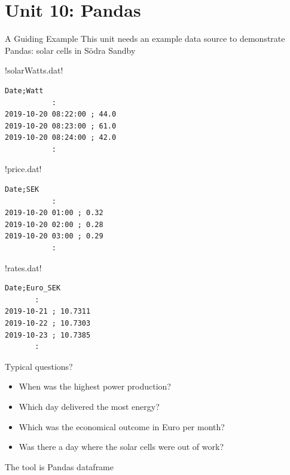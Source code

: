 \documentclass[hyperref={pdfpagelabels=false},table]{beamer}
\date{}
\begin{document}
\part{Unit 10: Pandas}


\begin{frame}[fragile]{A Guiding Example}
This unit needs an example data source to demonstrate
Pandas:  solar cells in Södra Sandby\\[0.5cm]
\begin{minipage}[h]{0.4\textwidth}
\lstset{basicstyle=\tiny}
\pyth!solarWatts.dat!
\begin{lstlisting}
Date;Watt
           :
2019-10-20 08:22:00 ; 44.0
2019-10-20 08:23:00 ; 61.0
2019-10-20 08:24:00 ; 42.0
           :
\end{lstlisting}
\end{minipage}
\begin{minipage}[h]{0.4\textwidth}
\lstset{basicstyle=\tiny}
\pyth!price.dat!
\begin{lstlisting}
Date;SEK
           :
2019-10-20 01:00 ; 0.32
2019-10-20 02:00 ; 0.28
2019-10-20 03:00 ; 0.29
           :
\end{lstlisting}
\end{minipage}
\begin{minipage}[h]{0.4\textwidth}
\lstset{basicstyle=\tiny}
\pyth!rates.dat!
\begin{lstlisting}
Date;Euro_SEK
       :
2019-10-21 ; 10.7311
2019-10-22 ; 10.7303
2019-10-23 ; 10.7385
       :

\end{lstlisting}
\end{minipage}
\end{frame}
\begin{frame}[fragile]{Typical questions?}
\begin{itemize}
\item When was the highest power production?
\item Which day delivered the most energy?
\item Which was the economical outcome in Euro per month?
\item Was there a day where the solar cells were out of work?
\end{itemize}
\end{frame}
\begin{frame}[fragile]
\vfill
The tool is Pandas dataframe
\vfill
\end{frame}
\end{document}
